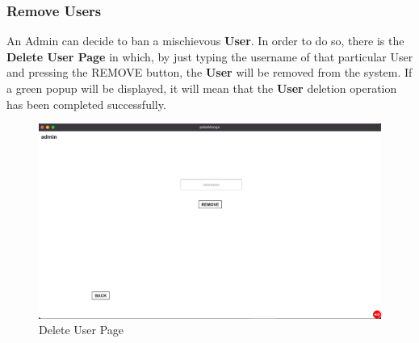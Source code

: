 \subsubsection{Remove Users}
An Admin can decide to ban a mischievous \textbf{User}. In order to do so, there is the \textbf{Delete User Page} in which, by just typing the username of that particular User and pressing the REMOVE button, the \textbf{User} will be removed from the system. If a green popup will be displayed, it will mean that the \textbf{User} deletion operation has been completed successfully. 
\begin{figure}[H]
	\centering
	\includegraphics[width=\textwidth]{img/userManual/delete_user.png}
	\caption{Delete User Page}
\end{figure}